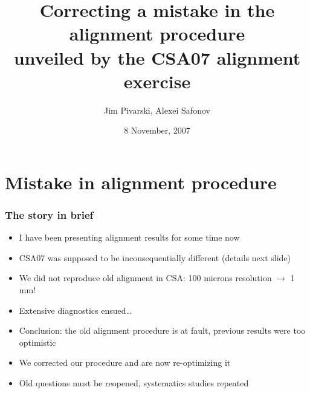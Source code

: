 \documentclass[compress]{beamer}
\title{Correcting a mistake in the alignment procedure \\ unveiled by the CSA07 alignment exercise}
\author{Jim Pivarski, Alexei Safonov}
\institute{Texas A\&M University}
\date{ 8 November, 2007}
\begin{document}
\frame{\titlepage}


\section*{Mistake in alignment procedure}

\begin{frame}
\frametitle{The story in brief}
\begin{itemize}\setlength{\itemsep}{0.25 cm}
\item I have been presenting alignment results for some time now
\item CSA07 was supposed to be inconsequentially different (details next slide)
\item We did not reproduce old alignment in CSA: 100 microns resolution $\to$ 1 mm!
\item Extensive diagnostics ensued\ldots
\item Conclusion: the old alignment procedure is at fault, previous results were too optimistic
\item We corrected our procedure and are now re-optimizing it
\item Old questions must be reopened, systematics studies repeated
\end{itemize}
\end{frame}
\end{document}
